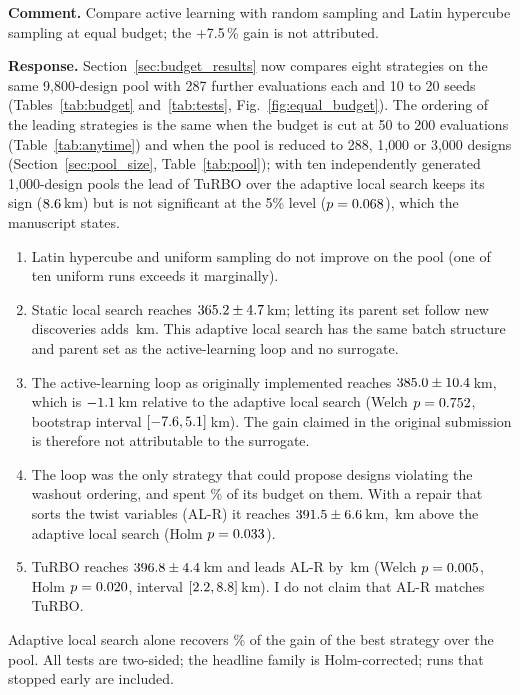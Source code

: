 \documentclass[11pt]{article}
\newcommand{\cmt}[1]{\par\medskip\noindent\textbf{Comment.} #1}
\newcommand{\rsp}[1]{\par\noindent\textbf{Response.} #1}
\begin{document}
\cmt{Compare active learning with random sampling and Latin hypercube sampling at equal budget; the +7.5\,\% gain is not attributed.}
\rsp{Section~\ref{sec:budget_results} now compares eight strategies on the same 9,800-design pool with 287 further evaluations each and 10 to 20 seeds (Tables~\ref{tab:budget} and~\ref{tab:tests}, Fig.~\ref{fig:equal_budget}). The ordering of the leading strategies is the same when the budget is cut at 50 to 200 evaluations (Table~\ref{tab:anytime}) and when the pool is reduced to 288, 1{,}000 or 3{,}000 designs (Section~\ref{sec:pool_size}, Table~\ref{tab:pool}); with ten independently generated 1{,}000-design pools the lead of TuRBO over the adaptive local search keeps its sign ($8.6$\,km) but is not significant at the 5\% level ($p = 0.068$), which the manuscript states.
\begin{enumerate}[leftmargin=1.5em,itemsep=2pt]
    \item Latin hypercube and uniform sampling do not improve on the pool (one of ten uniform runs exceeds it marginally).
    \item Static local search reaches $365.2 \pm 4.7$\,km; letting its parent set follow new discoveries adds \NvDAdaptvLocTen\,km. This adaptive local search has the same batch structure and parent set as the active-learning loop and no surrogate.
    \item The active-learning loop as originally implemented reaches $385.0 \pm 10.4$\,km, which is $-1.1$\,km relative to the adaptive local search (Welch $p = 0.752$, bootstrap interval $[-7.6, 5.1]$\,km). The gain claimed in the original submission is therefore not attributable to the surrogate.
    \item The loop was the only strategy that could propose designs violating the washout ordering, and spent \NvWashAL\% of its budget on them. With a repair that sorts the twist variables (AL-R) it reaches $391.5 \pm 6.6$\,km, \NvDALRvAdapt\,km above the adaptive local search (Holm $p = 0.033$).
    \item TuRBO reaches $396.8 \pm 4.4$\,km and leads AL-R by \NvDTurbovALR\,km (Welch $p = 0.005$, Holm $p = 0.020$, interval $[2.2, 8.8]$\,km). I do not claim that AL-R matches TuRBO.
\end{enumerate}
Adaptive local search alone recovers \NvShareAdapt\% of the gain of the best strategy over the pool. All tests are two-sided; the headline family is Holm-corrected; runs that stopped early are included.}
\end{document}
